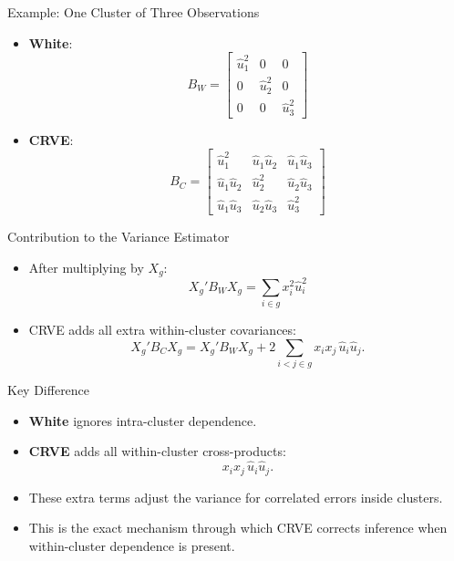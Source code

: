 \documentclass[
  ignorenonframetext,
]{beamer}
\providecommand{\tightlist}{%
  \setlength{\itemsep}{0pt}\setlength{\parskip}{0pt}}
\begin{document}
\begin{frame}{Example: One Cluster of Three Observations}
\label{example-one-cluster-of-three-observations}
\begin{itemize}
\tightlist
\item
  \textbf{White}: \[
  B_W =
  \begin{bmatrix}
  \hat u_1^2 & 0 & 0\\
  0 & \hat u_2^2 & 0\\
  0 & 0 & \hat u_3^2
  \end{bmatrix}
  \]
\item
  \textbf{CRVE}: \[
  B_C =
  \begin{bmatrix}
  \hat u_1^2 & \hat u_1\hat u_2 & \hat u_1\hat u_3\\
  \hat u_1\hat u_2 & \hat u_2^2 & \hat u_2\hat u_3\\
  \hat u_1\hat u_3 & \hat u_2\hat u_3 & \hat u_3^2
  \end{bmatrix}
  \]
\end{itemize}
\end{frame}

\begin{frame}{Contribution to the Variance Estimator}
\label{contribution-to-the-variance-estimator}
\begin{itemize}
\tightlist
\item
  After multiplying by \(X_g\): \[
  X_g' B_W X_g
  = \sum_{i\in g} x_i^2\hat u_i^2
  \]
\item
  CRVE adds all extra within-cluster covariances: \[
  X_g' B_C X_g
  =
  X_g' B_W X_g 
  +
  2\!\sum_{i<j\in g} x_i x_j\,\hat u_i\hat u_j.
  \]
\end{itemize}
\end{frame}

\begin{frame}{Key Difference}
\label{key-difference}
\begin{itemize}
\tightlist
\item
  \textbf{White} ignores intra-cluster dependence.\\
\item
  \textbf{CRVE} adds all within-cluster cross-products: \[
  x_i x_j\,\hat u_i\hat u_j.
  \]
\item
  These extra terms adjust the variance for correlated errors inside
  clusters.\\
\item
  This is the exact mechanism through which CRVE corrects inference when
  within-cluster dependence is present.
\end{itemize}
\end{frame}
\end{document}
